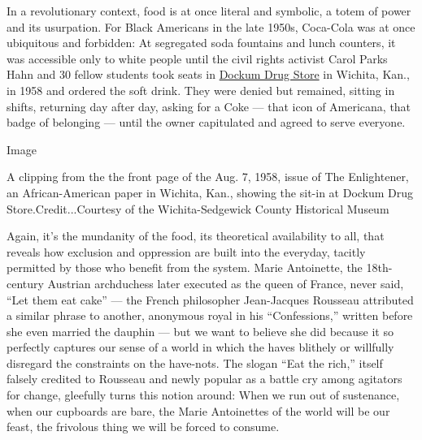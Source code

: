 In a revolutionary context, food is at once literal and symbolic, a
totem of power and its usurpation. For Black Americans in the late
1950s, Coca-Cola was at once ubiquitous and forbidden: At segregated
soda fountains and lunch counters, it was accessible only to white
people until the civil rights activist Carol Parks Hahn and 30 fellow
students took seats in
\href{https://www.npr.org/templates/story/story.php?storyId=6355095}{Dockum
Drug Store} in Wichita, Kan., in 1958 and ordered the soft drink. They
were denied but remained, sitting in shifts, returning day after day,
asking for a Coke --- that icon of Americana, that badge of belonging
--- until the owner capitulated and agreed to serve everyone.

Image

A clipping from the the front page of the Aug. 7, 1958, issue of The
Enlightener, an African-American paper in Wichita, Kan., showing the
sit-in at Dockum Drug Store.Credit...Courtesy of the Wichita-Sedgewick
County Historical Museum

Again, it's the mundanity of the food, its theoretical availability to
all, that reveals how exclusion and oppression are built into the
everyday, tacitly permitted by those who benefit from the system. Marie
Antoinette, the 18th-century Austrian archduchess later executed as the
queen of France, never said, ``Let them eat cake'' --- the French
philosopher Jean-Jacques Rousseau attributed a similar phrase to
another, anonymous royal in his ``Confessions,'' written before she even
married the dauphin --- but we want to believe she did because it so
perfectly captures our sense of a world in which the haves blithely or
willfully disregard the constraints on the have-nots. The slogan ``Eat
the rich,'' itself falsely credited to Rousseau and newly popular as a
battle cry among agitators for change, gleefully turns this notion
around: When we run out of sustenance, when our cupboards are bare, the
Marie Antoinettes of the world will be our feast, the frivolous thing we
will be forced to consume.

